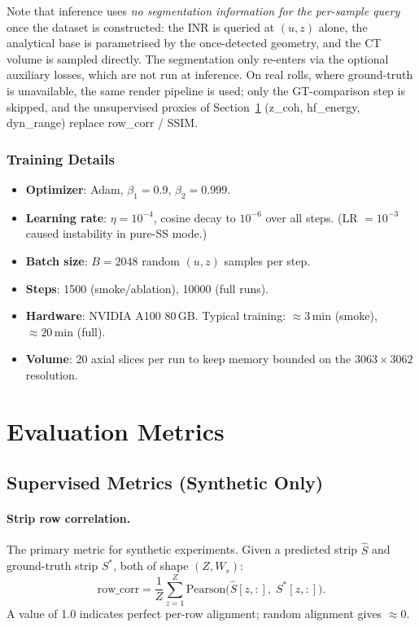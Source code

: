 \documentclass[11pt,a4paper]{article}
\begin{document}
Note that inference uses \emph{no segmentation information for the per-sample query} once the dataset is constructed: the INR is queried at $(u, z)$ alone, the analytical base is parametrised by the once-detected geometry, and the CT volume is sampled directly. The segmentation only re-enters via the optional auxiliary losses, which are not run at inference. On real rolls, where ground-truth is unavailable, the same render pipeline is used; only the GT-comparison step is skipped, and the unsupervised proxies of Section~\ref{sec:metrics} (z\_coh, hf\_energy, dyn\_range) replace row\_corr / SSIM.

\subsubsection{Training Details}

\begin{itemize}
    \item \textbf{Optimizer}: Adam, $\beta_1 = 0.9$, $\beta_2 = 0.999$.
    \item \textbf{Learning rate}: $\eta = 10^{-4}$, cosine decay to $10^{-6}$ over all steps. (LR $= 10^{-3}$ caused instability in pure-SS mode.)
    \item \textbf{Batch size}: $B = 2048$ random $(u, z)$ samples per step.
    \item \textbf{Steps}: 1500 (smoke/ablation), 10000 (full runs).
    \item \textbf{Hardware}: NVIDIA A100 80\,GB. Typical training: $\approx 3\,\text{min}$ (smoke), $\approx 20\,\text{min}$ (full).
    \item \textbf{Volume}: 20 axial slices per run to keep memory bounded on the $3063 \times 3062$ resolution.
\end{itemize}


\section{Evaluation Metrics}
\label{sec:metrics}

\subsection{Supervised Metrics (Synthetic Only)}

\paragraph{Strip row correlation.}
The primary metric for synthetic experiments. Given a predicted strip $\hat{S}$ and ground-truth strip $S^*$, both of shape $(Z, W_s)$:
\begin{equation}
    \text{row\_corr} = \frac{1}{Z}\sum_{z=1}^{Z} \text{Pearson}\bigl(\hat{S}[z,:],\; S^*[z,:]\bigr).
    \label{eq:row_corr}
\end{equation}
A value of 1.0 indicates perfect per-row alignment; random alignment gives $\approx 0$.
\end{document}
